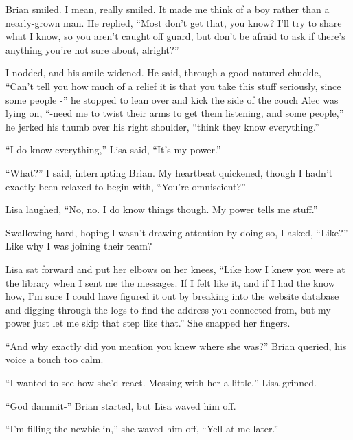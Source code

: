 Brian smiled.  I mean, really smiled.  It made me think of a boy rather than a nearly-grown man.  He replied, ``Most don't get that, you know?  I'll try to share what I know, so you aren't caught off guard, but don't be afraid to ask if there's anything you're not sure about, alright?''



I nodded, and his smile widened.  He said, through a good natured chuckle, ``Can't tell you how much of a relief it is that you take this stuff seriously, since some people -'' he stopped to lean over and kick the side of the couch Alec was lying on, ``-need me to twist their arms to get them listening, and some people,'' he jerked his thumb over his right shoulder, ``think they know everything.''



``I do know everything,'' Lisa said, ``It's my power.''



``What?'' I said, interrupting Brian.  My heartbeat quickened, though I hadn't exactly been relaxed to begin with, ``You're omniscient?''



Lisa laughed, ``No, no.  I do know things though.  My power tells me stuff.''



Swallowing hard, hoping I wasn't drawing attention by doing so, I asked, ``Like?''  Like why I was joining their team?



Lisa sat forward and put her elbows on her knees, ``Like how I knew you were at the library when I sent me the messages.  If I felt like it, and if I had the know how, I'm sure I could have figured it out by breaking into the website database and digging through the logs to find the address you connected from, but my power just let me skip that step like that.'' She snapped her fingers.



``And why exactly did you mention you knew where she was?'' Brian queried, his voice a touch too calm.



``I wanted to see how she'd react.  Messing with her a little,'' Lisa grinned.



``God dammit-'' Brian started, but Lisa waved him off.



``I'm filling the newbie in,'' she waved him off, ``Yell at me later.''



